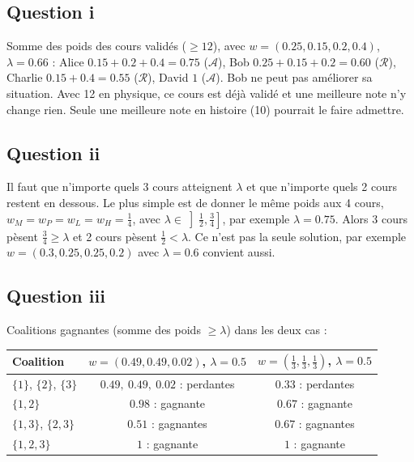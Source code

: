 \documentclass[10pt,a4paper]{article}
\newcommand{\A}{\mathcal{A}}
\newcommand{\R}{\mathcal{R}}
\begin{document}
\subsection*{Question i}

Somme des poids des cours validés ($\geq 12$), avec $w=(0.25,0.15,0.2,0.4)$, $\lambda=0.66$ :
Alice $0.15+0.2+0.4=0.75$ ($\A$), Bob $0.25+0.15+0.2=0.60$ ($\R$),
Charlie $0.15+0.4=0.55$ ($\R$), David $1$ ($\A$).
Bob ne peut pas améliorer sa situation. Avec 12 en physique, ce cours est déjà validé et une meilleure note
n'y change rien. Seule une meilleure note en histoire (10) pourrait le faire admettre.

\subsection*{Question ii}

Il faut que n'importe quels 3 cours atteignent $\lambda$ et que n'importe quels 2 cours restent en dessous. Le plus simple
est de donner le même poids aux 4 cours, $w_M=w_P=w_L=w_H=\frac14$, avec $\lambda\in\left]\frac12,\frac34\right]$, par exemple
$\lambda=0.75$. Alors 3 cours pèsent $\frac34\geq\lambda$ et 2 cours pèsent $\frac12<\lambda$. Ce n'est pas la seule solution,
par exemple $w=(0.3,0.25,0.25,0.2)$ avec $\lambda=0.6$ convient aussi.

\subsection*{Question iii}

Coalitions gagnantes (somme des poids $\geq \lambda$) dans les deux cas :

\begin{center}
\begin{tabular}{lcc}
\toprule
Coalition & $w = (0.49, 0.49, 0.02)$, $\lambda=0.5$ & $w = (\frac13,\frac13,\frac13)$, $\lambda=0.5$ \\
\midrule
$\{1\}$, $\{2\}$, $\{3\}$ & $0.49,\ 0.49,\ 0.02$ : perdantes & $0.33$ : perdantes \\
$\{1,2\}$ & $0.98$ : gagnante & $0.67$ : gagnante \\
$\{1,3\}$, $\{2,3\}$ & $0.51$ : gagnantes & $0.67$ : gagnantes \\
$\{1,2,3\}$ & $1$ : gagnante & $1$ : gagnante \\
\bottomrule
\end{tabular}
\end{center}
\end{document}
